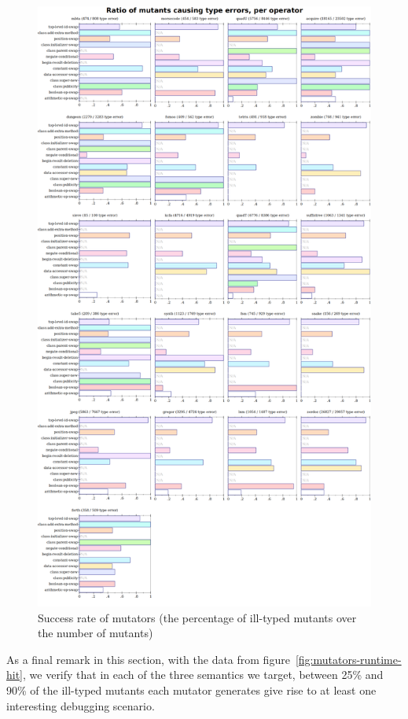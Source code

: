 \begin{figure}
  \centering
  \includegraphics[width=\textwidth]{./plots/code-hit-ratios}
  \caption{Success rate of mutators (the percentage of ill-typed mutants
  over the number of mutants)}
  \label{fig:mutators-static-hit}
\end{figure}



As a
final remark in this section, with the data from
figure~\ref{fig:mutators-runtime-hit}, we verify  that in each of the three semantics
we target, between 25\% and
90\% of the ill-typed mutants each mutator generates give rise to at least one interesting debugging scenario.


